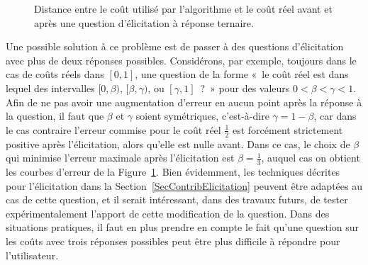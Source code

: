 \documentclass[a4paper,11pt]{article}
\theoremstyle{plain}
\theoremstyle{definition}
\begin{document}
\begin{figure}[ht]
\centering
\resizebox{0.5\textwidth}{!}{}
\caption{Distance entre le coût utilisé par l'algorithme et le coût réel avant et après une question d'élicitation à réponse ternaire.}
\label{FigElicitationTernaire}
\end{figure}

Une possible solution à ce problème est de passer à des questions d'élicitation avec plus de deux réponses possibles. Considérons, par exemple, toujours dans le cas de coûts réels dans $[0, 1]$, une question de la forme «~le coût réel est dans lequel des intervalles $[0, \beta)$, $[\beta, \gamma)$, ou $[\gamma, 1]$~?~» pour des valeurs $0 < \beta < \gamma < 1$. Afin de ne pas avoir une augmentation d'erreur en aucun point après la réponse à la question, il faut que $\beta$ et $\gamma$ soient symétriques, c'est-à-dire $\gamma = 1 - \beta$, car dans le cas contraire l'erreur commise pour le coût réel $\frac{1}{2}$ est forcément strictement positive après l'élicitation, alors qu'elle est nulle avant. Dans ce cas, le choix de $\beta$ qui minimise l'erreur maximale après l'élicitation est $\beta = \frac{1}{3}$, auquel cas on obtient les courbes d'erreur de la Figure~\ref{FigElicitationTernaire}. Bien évidemment, les techniques décrites pour l'élicitation dans la Section~\ref{SecContribElicitation} peuvent être adaptées au cas de cette question, et il serait intéressant, dans des travaux futurs, de tester expérimentalement l'apport de cette modification de la question. Dans des situations pratiques, il faut en plus prendre en compte le fait qu'une question sur les coûts avec trois réponses possibles peut être plus difficile à répondre pour l'utilisateur.




\appendix
\end{document}
